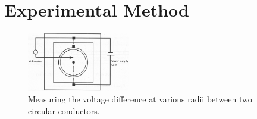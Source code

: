 \documentclass[letterpaper]{article}
\begin{document}

\section{Experimental Method}



\begin{figure}[H]
    \centering
    \includegraphics[width=0.4\textwidth]{fig2.jpg}
    \caption{Measuring the voltage difference at various radii between two circular conductors. \cite{labmanual}}
\end{figure}
\end{document}
